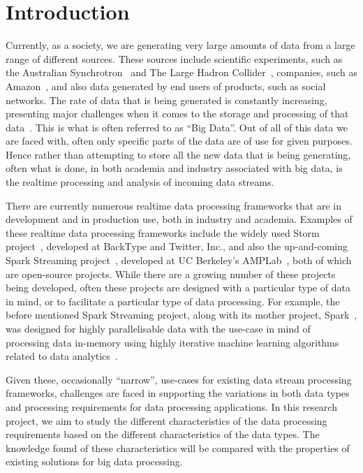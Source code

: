 \documentclass[a4paper,11pt]{article}
\begin{document}

\section{Introduction} %
\label{sec:introduction}

Currently, as a society, we are generating very large amounts of data from a large range of different sources. These
sources include scientific experiments, such as the Australian Synchrotron~\cite{web:synchrotron} and The Large Hadron
Collider~\cite{web:LHC}, companies, such as Amazon~\cite{web:Amazon}, and also data generated by end users of products,
such as social networks. The rate of data that is being generated is constantly increasing, presenting major challenges
when it comes to the storage and processing of that data~\cite{bohlouli_towards_2013}. This is what is often referred to
as ``Big Data''. Out of all of this data we are faced with, often only specific parts of the data are of use for given
purposes. Hence rather than attempting to store all the new data that is being generating, often what is done, in both
academia and industry associated with big data, is the realtime processing and analysis of incoming data streams.

There are currently numerous realtime data processing frameworks that are in development and in production use, both in
industry and academia. Examples of these realtime data processing frameworks include the widely used Storm
project~\cite{web:Storm}, developed at BackType and Twitter, Inc., and also the up-and-coming Spark Streaming
project~\cite{web:SparkStreaming}, developed at UC Berkeley's AMPLab~\cite{web:UCBerkelyAMCLab}, both of which are
open-source projects. While there are a growing number of these projects being developed, often these projects are designed
with a particular type of data in mind, or to facilitate a particular type of data processing. For example, the before
mentioned Spark Streaming project, along with its mother project, Spark~\cite{web:Spark}, was designed for highly
parallelisable data with the use-case in mind of processing data in-memory using highly iterative machine learning
algorithms related to data analytics~\cite{liu_survey_2014}.

Given these, occasionally ``narrow'', use-cases for existing data stream processing frameworks, challenges are faced in
supporting the variations in both data types and processing requirements for data processing applications. In this
research project, we aim to study the different characteristics of the data processing requirements based on the
different characteristics of the data types. The knowledge found of these characteristics will be compared with the
properties of existing solutions for big data processing.
\end{document}
